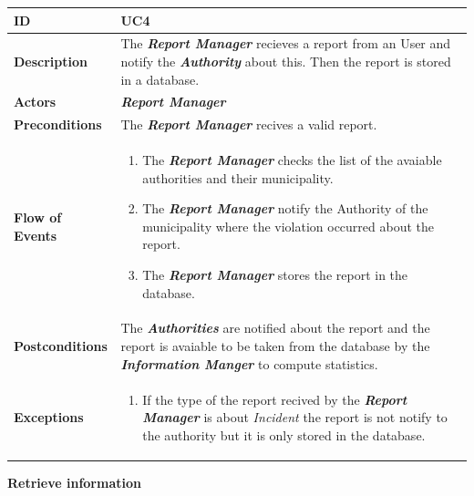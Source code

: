 \documentclass{report}
\begin{document}
\begin{tabularx}{\linewidth}{| l | X |}
	\hline
	\textbf{ID} & UC4\\
	
	\hline
	\textbf{Description} & The \textbf{\textit{Report Manager}} recieves a report from an User and notify the \textbf{\textit{Authority}} about this. Then the report is stored in a database.\\
	
	\hline
	\textbf{Actors} & \textbf{\textit{Report Manager}}\\
	
	\hline
	\textbf{Preconditions} & The \textbf{\textit{Report Manager}} recives a valid report.\\
	
	\hline
	\textbf{Flow of Events} & \parbox{0.7\textwidth}{\begin{enumerate}
			\item The \textbf{\textit{Report Manager}} checks the list of the avaiable authorities and their municipality.			
			\item The \textbf{\textit{Report Manager}} notify the Authority of the municipality where the violation occurred about the report.
			
			\item The \textbf{\textit{Report Manager}} stores the report in the database.
					
			
	\end{enumerate}}\\
	
	\hline
	\textbf{Postconditions} & The \textbf{\textit{Authorities}} are notified about the report and the report is avaiable to be taken from the database by the \textbf{\textit{Information Manger}} to compute statistics.\\
	
	\hline
	\textbf{Exceptions} & \parbox{0.7\textwidth}{ \begin{enumerate}
			\item If the type of the report recived by the \textbf{\textit{Report Manager}} is about \textit{Incident} the report is not notify to the authority but it is only stored in the database. 
		\end{enumerate}}\\
	
	\hline
	
\end{tabularx}
\begin{center}
	\textbf{Retrieve information}
\end{center}
\end{document}
